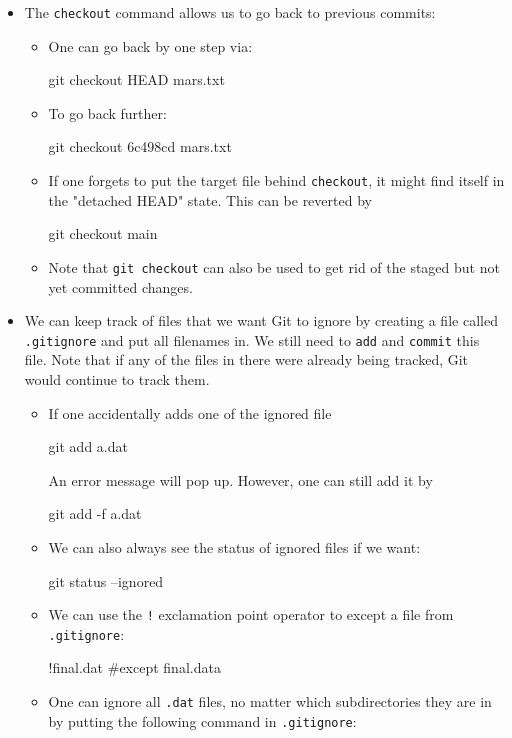 \documentclass[UTF8]{book}
\newcommand{\code}[1]{\colorbox{codegray}{\texttt{#1}}}
\begin{document}
\begin{itemize}
\item The \code{checkout} command allows us to go back to previous commits:
\begin{itemize}
	\item One can go back by one step via:
\begin{bash}	
git checkout HEAD mars.txt
\end{bash}
	\item To go back further:
\begin{bash}
git checkout 6c498cd mars.txt
\end{bash}
	\item If one forgets to put the target file behind \code{checkout}, it might find itself in the "detached HEAD" state. This can be reverted by
\begin{bash}
git checkout main
\end{bash}
	\item Note that \code{git checkout} can also be used to get rid of the staged but not yet committed changes.
\end{itemize}
\item We can keep track of files that we want Git to ignore by creating a file called \code{.gitignore} and put all filenames in. We still need to \code{add} and \code{commit} this file. Note that if any of the files in there were already being tracked, Git would continue to track them.
\begin{itemize}
	\item If one accidentally adds one of the ignored file
\begin{bash}
git add a.dat
\end{bash}
An error message will pop up. However, one can still add it by
\begin{bash}
git add -f a.dat
\end{bash}
	\item We can also always see the status of ignored files if we want:
\begin{bash}
git status  --ignored
\end{bash}
	\item We can use the \code{!} exclamation point operator to except a file from \code{.gitignore}:
\begin{bash}
!final.dat #except final.data
\end{bash}
	\item One can ignore all \code{.dat} files, no matter which subdirectories they are in by putting the following command in \code{.gitignore}:
\begin{bash}

\end{bash}
\end{itemize}
\end{itemize}
\end{document}
